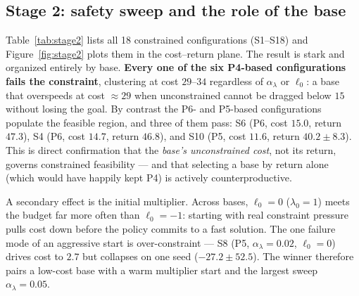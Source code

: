 \documentclass{article}
\newcommand{\figref}[1]{Figure~\ref{#1}}
\newcommand{\tabref}[1]{Table~\ref{#1}}
\begin{document}
\subsection{Stage 2: safety sweep and the role of the base}
\tabref{tab:stage2} lists all 18 constrained configurations (S1--S18) and
\figref{fig:stage2} plots them in the cost--return plane.
The result is stark and organized entirely by base. \textbf{Every one of the six P4-based
configurations fails the constraint}, clustering at cost $29$--$34$ regardless of $\alpha_\lambda$
or $\ell_0$: a base that overspeeds at cost $\approx 29$ when unconstrained cannot be dragged
below $15$ without losing the goal. By contrast the P6- and P5-based configurations populate the
feasible region, and three of them pass: S6 (P6, cost $15.0$, return $47.3$), S4 (P6, cost $14.7$,
return $46.8$), and S10 (P5, cost $11.6$, return $40.2 \pm 8.3$). This is direct confirmation that
the \emph{base's unconstrained cost}, not its return, governs constrained feasibility --- and that
selecting a base by return alone (which would have happily kept P4) is actively
counterproductive.

A secondary effect is the initial multiplier. Across bases, $\ell_0 = 0$ ($\lambda_0 = 1$) meets
the budget far more often than $\ell_0 = -1$: starting with real constraint pressure pulls cost
down before the policy commits to a fast solution. The one failure mode of an aggressive start is
over-constraint --- S8 (P5, $\alpha_\lambda{=}0.02$, $\ell_0{=}0$) drives cost to $2.7$ but
collapses on one seed ($-27.2 \pm 52.5$). The winner therefore pairs a low-cost base with a warm
multiplier start and the largest sweep $\alpha_\lambda{=}0.05$.
\end{document}
